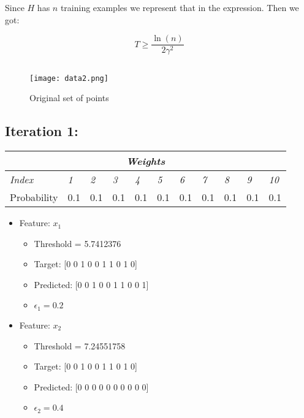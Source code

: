 \documentclass[11pt]{article}
\begin{document}
Since $H$ has $n$ training examples we represent that in the expression. Then we got:

$$T \geq \frac{\ln(n)}{2 \gamma^2}$$

\subsection{}
\begin{figure}[H]
  \caption{Original set of points}
  \texttt{[image: data2.png]}
  \centering
\end{figure}

\subsection*{Iteration 1:} 

\begin{table}[H]
\centering
\begin{tabular}{ |p{2cm}||p{0.7cm}|p{0.7cm}|p{0.7cm}|p{0.7cm}|p{0.7cm}|p{0.7cm}|p{0.7cm}|p{0.7cm}|p{0.7cm}|p{0.7cm}|  }
 \hline
 \multicolumn{11}{|c|}{\textbf{\textit{Weights}}} \\
 \hline
 \textit{Index} & \textit{1} & \textit{2} & \textit{3} & \textit{4} & \textit{5} & \textit{6} & \textit{7} & \textit{8} & \textit{9} & \textit{10} \\
 \hline
 Probability   & 0.1 & 0.1 & 0.1 & 0.1 & 0.1 & 0.1 & 0.1 & 0.1 & 0.1 & 0.1  \\
 \hline
\end{tabular}
\end{table}

\begin{itemize}
\item Feature: $x_1$
    \begin{itemize}
    \item Threshold = 5.7412376
    \item Target: [0 0 1 0 0 1 1 0 1 0]
    \item Predicted: [0 0 1 0 0 1 1 0 0 1]
    \item $\epsilon_1 = 0.2$
    \end{itemize}
\item Feature: $x_2$
    \begin{itemize}
    \item Threshold = 7.24551758
    \item Target: [0 0 1 0 0 1 1 0 1 0]
    \item Predicted: [0 0 0 0 0 0 0 0 0 0]
    \item $\epsilon_2 = 0.4$
    \end{itemize}
\end{itemize}
\end{document}
